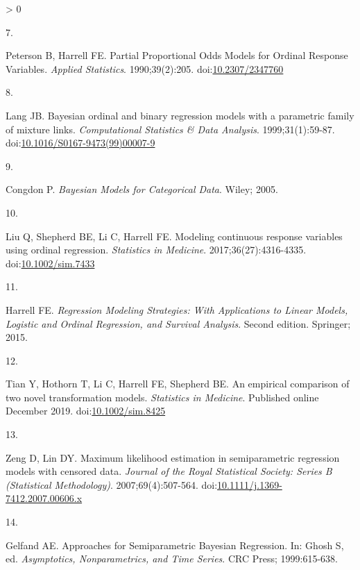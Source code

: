 \documentclass[
]{article}
\newlength{\cslhangindent}
\newlength{\csllabelwidth}
\newenvironment{CSLReferences}[2] %
 {%
  \setlength{\parindent}{0pt}
  \ifodd #1 \everypar{\setlength{\hangindent}{\cslhangindent}}\ignorespaces\fi
  \ifnum #2 > 0
  \setlength{\parskip}{#2\baselineskip}
  \fi
 }%
 {}
\newcommand{\CSLLeftMargin}[1]{\parbox[t]{\csllabelwidth}{#1}}
\newcommand{\CSLRightInline}[1]{\parbox[t]{\linewidth - \csllabelwidth}{#1}\break}
\begin{document}
\begin{CSLReferences}{0}{0}
\leavevmode\hypertarget{ref-peterson_partial_1990}{}%
\CSLLeftMargin{7. }
\CSLRightInline{Peterson B, Harrell FE. Partial {Proportional} {Odds} {Models} for {Ordinal} {Response} {Variables}. \emph{Applied Statistics}. 1990;39(2):205. doi:\href{https://doi.org/10.2307/2347760}{10.2307/2347760}}

\leavevmode\hypertarget{ref-lang_bayesian_1999}{}%
\CSLLeftMargin{8. }
\CSLRightInline{Lang JB. Bayesian ordinal and binary regression models with a parametric family of mixture links. \emph{Computational Statistics \& Data Analysis}. 1999;31(1):59-87. doi:\href{https://doi.org/10.1016/S0167-9473(99)00007-9}{10.1016/S0167-9473(99)00007-9}}

\leavevmode\hypertarget{ref-congdon_bayesian_2005}{}%
\CSLLeftMargin{9. }
\CSLRightInline{Congdon P. \emph{Bayesian Models for Categorical Data}. Wiley; 2005.}

\leavevmode\hypertarget{ref-liu_modeling_2017}{}%
\CSLLeftMargin{10. }
\CSLRightInline{Liu Q, Shepherd BE, Li C, Harrell FE. Modeling continuous response variables using ordinal regression. \emph{Statistics in Medicine}. 2017;36(27):4316-4335. doi:\href{https://doi.org/10.1002/sim.7433}{10.1002/sim.7433}}

\leavevmode\hypertarget{ref-harrell_regression_2015}{}%
\CSLLeftMargin{11. }
\CSLRightInline{Harrell FE. \emph{Regression Modeling Strategies: With Applications to Linear Models, Logistic and Ordinal Regression, and Survival Analysis}. Second edition. Springer; 2015.}

\leavevmode\hypertarget{ref-tian_empirical_2019}{}%
\CSLLeftMargin{12. }
\CSLRightInline{Tian Y, Hothorn T, Li C, Harrell FE, Shepherd BE. An empirical comparison of two novel transformation models. \emph{Statistics in Medicine}. Published online December 2019. doi:\href{https://doi.org/10.1002/sim.8425}{10.1002/sim.8425}}

\leavevmode\hypertarget{ref-zeng_maximum_2007}{}%
\CSLLeftMargin{13. }
\CSLRightInline{Zeng D, Lin DY. Maximum likelihood estimation in semiparametric regression models with censored data. \emph{Journal of the Royal Statistical Society: Series B (Statistical Methodology)}. 2007;69(4):507-564. doi:\href{https://doi.org/10.1111/j.1369-7412.2007.00606.x}{10.1111/j.1369-7412.2007.00606.x}}

\leavevmode\hypertarget{ref-gelfand_approaches_1999}{}%
\CSLLeftMargin{14. }
\CSLRightInline{Gelfand AE. Approaches for {Semiparametric} {Bayesian} {Regression}. In: Ghosh S, ed. \emph{Asymptotics, {Nonparametrics}, and {Time} {Series}}. CRC Press; 1999:615-638.}


\end{CSLReferences}
\end{document}
